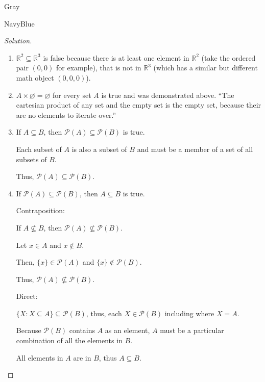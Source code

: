 \documentclass[12pt]{amsart}
\theoremstyle{named}
\newenvironment{soln}
{\begin{color}{Gray}\begin{framed}\begin{color}{NavyBlue}\begin{proof}[Solution]
\doublespacing}
{\end{proof}\end{color}\end{framed}\end{color}}
\theoremstyle{definition}
\newcommand{\R}{\mathbb R}
\begin{document}
\begin{soln}
    \phantom{ }
    \begin{enumerate}
        \item $\R^2\subseteq\R^3$ is false because there is at least one element
        in $\R^2$ (take the ordered pair $(0,0)$ for example), that is not in
        $\R^3$ (which has a similar but different math object $(0,0,0)$). 

        \item $A\times\varnothing = \varnothing$ for every set $A$ is true and
        was demonstrated above. ``The cartesian product of any set and the
        empty set is the empty set, because their are no elements to iterate
        over.'' 

        \item If $A\subseteq B$, then $\mathscr P(A)\subseteq\mathscr P(B)$ is
        true. 
            
        \noindent Each subset of $A$ is also a subset of $B$ and must be a member of a set of all subsets of $B$. 
        
        \noindent Thus, $\mathscr P(A)\subseteq \mathscr P(B)$.

        \phantom{ }

        \phantom{ }

        \phantom{ }

        \item If $\mathscr P(A)\subseteq\mathscr P(B)$, then $A\subseteq B$ is true.
        

        \noindent Contraposition: 
        
        \begin{adjustwidth}{2em}{0em}
            If $A \nsubseteq B$, then $\mathscr P(A) \nsubseteq \mathscr P(B)$.

            \noindent Let $x \in A$ and $x \notin B$. 
            
            \noindent Then, $\{x\} \in \mathscr P(A)$ and $\{x\} \notin \mathscr P(B)$. 
            
            \noindent Thus, $\mathscr P(A) \nsubseteq \mathscr P(B)$. 
        \end{adjustwidth}


        \noindent Direct:
        \begin{adjustwidth}{2em}{0em}
            $\{X : X \subseteq A\} \subseteq \mathscr P(B)$, thus, each $X \in \mathscr P(B)$ including where $X = A$. 
            
            \noindent Because $\mathscr P(B)$ contains $A$ as an element, $A$ must be a particular combination of all the elements in $B$. 
            
            \noindent All elements in $A$ are in $B$, thus $A \subseteq B$. 
        \end{adjustwidth}
	\end{enumerate}
\end{soln}
\end{document}
